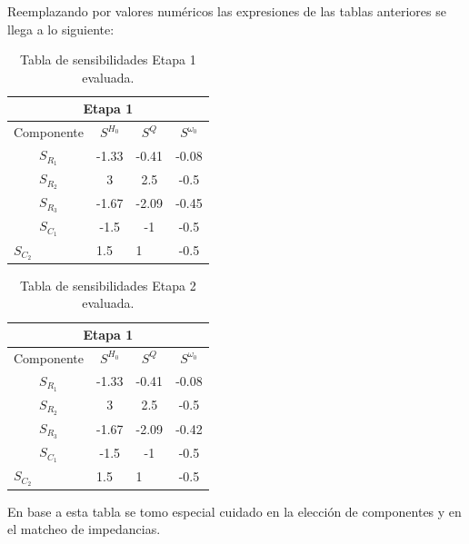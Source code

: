 Reemplazando por valores numéricos las expresiones de las tablas anteriores se llega a lo siguiente:
\begin{table}[H]
\centering
\begin{tabular}{cccc}
\hline
\multicolumn{4}{c}{Etapa 1}                                                                      \\ \hline
Componente                    & $S^{H_0}$               & $S^{Q}$               & $S^{\omega_0}$ \\ \hline
$S_{R_1}$                     & -1.33                   & -0.41                 & -0.08          \\
$S_{R_2}$                     & 3                       & 2.5                   & -0.5           \\
$S_{R_3}$                     & -1.67                   & -2.09                 & -0.45          \\
$S_{C_1}$                     & -1.5                    & -1                    & -0.5           \\
\multicolumn{1}{l}{$S_{C_2}$} & \multicolumn{1}{l}{1.5} & \multicolumn{1}{l}{1} & -0.5          
\end{tabular}
\caption{Tabla de sensibilidades Etapa 1 evaluada.}
\end{table}
\begin{table}[H]
\centering
\begin{tabular}{cccc}
\hline
\multicolumn{4}{c}{Etapa 1}                                                                      \\ \hline
Componente                    & $S^{H_0}$               & $S^{Q}$               & $S^{\omega_0}$ \\ \hline
$S_{R_1}$                     & -1.33                   & -0.41                 & -0.08          \\
$S_{R_2}$                     & 3                       & 2.5                   & -0.5           \\
$S_{R_3}$                     & -1.67                   & -2.09                 & -0.42          \\
$S_{C_1}$                     & -1.5                    & -1                    & -0.5           \\
\multicolumn{1}{l}{$S_{C_2}$} & \multicolumn{1}{l}{1.5} & \multicolumn{1}{l}{1} & -0.5          
\end{tabular}
\caption{Tabla de sensibilidades Etapa 2 evaluada.}
\end{table}
En base a esta tabla se tomo especial cuidado en la elección de componentes y en el matcheo de impedancias.
